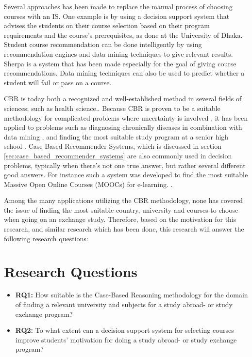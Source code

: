 Several approaches has been made to replace the manual process of choosing courses with an IS. One example is by using a decision support system that advises the students on their course selection based on their program requirements and the course's prerequisites, as done at the University of Dhaka\cite{roushan2014university}. Student course recommendation can be done intelligently by using recommendation engines and data mining techniques to give relevant results. Sherpa\cite{bramucci2012sherpa} is a system that has been made especially for the goal of giving course recommendations. Data mining techniques can also be used to predict whether a student will fail or pass on a course\cite{vialardi2009recommendation}.

CBR is today both a recognized and well-established method in several fields of sciences; such as health science.\cite{begum2011case}. Because CBR is proven to be a suitable methodology for complicated problems where uncertainty is involved \cite{richter2013case}, it has been applied to problems such as diagnosing chronically diseases in combination with data mining \cite{huang2007integrating}, and finding the most suitable study program at a senior high school \cite{mulyana2015case}. Case-Based Recommender Systems, which is discussed in section \ref{sec:case_based_recommender_systems} are also commonly used in decision problems, typically when there's not one true answer, but rather several different good answers. For instance such a system was developed to find the most suitable Massive Open Online Courses (MOOCs) for e-learning. \cite{bousbahi2015mooc}. 

Among the many applications utilizing the CBR methodology, none has covered the issue of finding the most suitable country, university and courses to choose when going on an exchange study. Therefore, based on the motivation for this research, and similar research which has been done, this research will answer the following research questions:

\section{Research Questions}

\begin{itemize}
    \item \textbf{RQ1:} How suitable is the Case-Based Reasoning methodology for the domain of finding a relevant university and subjects for a study abroad- or study exchange program?
    \item \textbf{RQ2:} To what extent can a decision support system for selecting courses improve students' motivation for doing a study abroad- or study exchange program?
\end{itemize}


